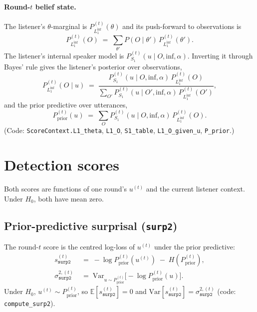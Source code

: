\documentclass[11pt]{article}
\newcommand{\Obs}{O}                 %
\newcommand{\Utt}{u}                 %
\newcommand{\SOne}{S_1}
\newcommand{\LOne}{L_1}
\newcommand{\Pspk}[2]{P^{(#2)}_{#1}}
\newcommand{\Ent}{H}
\newcommand{\Var}{\mathrm{Var}}
\newcommand{\E}{\mathbb{E}}
\newcommand{\Inffn}{\mathrm{inf}}
\begin{document}
\paragraph{Round-$t$ belief state.} The listener's $\theta$-marginal is
$\Pspk{\LOne^{\Inffn}}{t}(\theta)$ and its push-forward to observations
is
\begin{equation}
    \Pspk{\LOne^{\Inffn}}{t}(\Obs)
    \;=\; \sum_{\theta'} P(\Obs \mid \theta')\,
          \Pspk{\LOne^{\Inffn}}{t}(\theta').
    \label{eq:listener-marginals}
\end{equation}
The listener's internal speaker model is $\Pspk{\SOne}{t}(\Utt \mid \Obs, \Inffn, \alpha)$.
Inverting it through Bayes' rule gives the listener's posterior over
observations,
\[
    \Pspk{\LOne^{\Inffn}}{t}(\Obs \mid \Utt)
    \;=\;
    \frac{\Pspk{\SOne}{t}(\Utt \mid \Obs, \Inffn, \alpha)\,
          \Pspk{\LOne^{\Inffn}}{t}(\Obs)}
         {\sum_{\Obs'} \Pspk{\SOne}{t}(\Utt \mid \Obs', \Inffn, \alpha)\,
          \Pspk{\LOne^{\Inffn}}{t}(\Obs')},
\]
and the prior predictive over utterances,
\[
    \Pspk{\mathrm{prior}}{t}(\Utt)
    \;=\; \sum_{\Obs}
    \Pspk{\SOne}{t}(\Utt \mid \Obs, \Inffn, \alpha)\,
    \Pspk{\LOne^{\Inffn}}{t}(\Obs).
\]
(Code: \texttt{ScoreContext.L1\_theta}, \texttt{L1\_O}, \texttt{S1\_table},
\texttt{L1\_O\_given\_u}, \texttt{P\_prior}.)

\section{Detection scores}

Both scores are functions of one round's \(\Utt^{(t)}\) and the current
listener context. Under $H_0$, both have mean zero.

\subsection*{Prior-predictive surprisal (\texttt{surp2})}

The round-$t$ score is the centred log-loss of $\Utt^{(t)}$ under the
prior predictive:
\begin{align}
    s^{(t)}_{\texttt{surp2}}
    &\;=\; -\log \Pspk{\mathrm{prior}}{t}(\Utt^{(t)})
        \;-\; \Ent\!\left(\Pspk{\mathrm{prior}}{t}\right),
    \label{eq:surp2-score}\\
    \sigma^{2,(t)}_{\texttt{surp2}}
    &\;=\;
    \Var_{\Utt \sim \Pspk{\mathrm{prior}}{t}}\!\bigl[-\log \Pspk{\mathrm{prior}}{t}(\Utt)\bigr].
    \label{eq:surp2-var}
\end{align}
Under $H_0$, $\Utt^{(t)} \sim \Pspk{\mathrm{prior}}{t}$, so
$\E[s^{(t)}_{\texttt{surp2}}] = 0$ and $\Var[s^{(t)}_{\texttt{surp2}}]
= \sigma^{2,(t)}_{\texttt{surp2}}$ (code: \texttt{compute\_surp2}).
\end{document}
